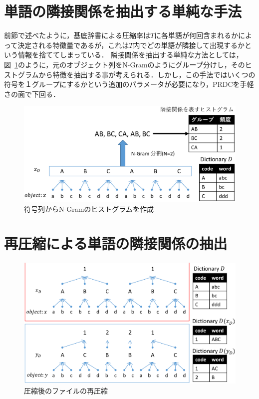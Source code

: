 \section{単語の隣接関係を抽出する単純な手法} %
\label{sec:単語の隣接関係を抽出する単純な手法}
前節で述べたように，基底辞書による圧縮率は$T$に各単語が何回含まれるかによって決定される特徴量であるが，これは$T$内でどの単語が隣接して出現するかという情報を捨ててしまっている．
隣接関係を抽出する単純な方法としては，図~\ref{fig:image/N-Gram.eps}のように，元のオブジェクト列をN-Gramのようにグループ分けし，そのヒストグラムから特徴を抽出する事が考えられる．しかし，この手法ではいくつの符号を１グループにするかという追加のパラメータが必要になり，PRDCを手軽さの面で下回る．

\begin{figure}[tb]
\begin{center}
\includegraphics[clip, width=\columnwidth]{image/N-Gram.eps}
\caption{符号列からN-Gramのヒストグラムを作成}
\label{fig:image/N-Gram.eps}
\end{center}
\end{figure}



\section{再圧縮による単語の隣接関係の抽出}
\begin{figure}[tb]
\begin{center}
\includegraphics[clip, width=\columnwidth]{image/recompress.eps}
\caption{圧縮後のファイルの再圧縮}
\label{fig:image/recompress.eps}
\end{center}
\end{figure}


